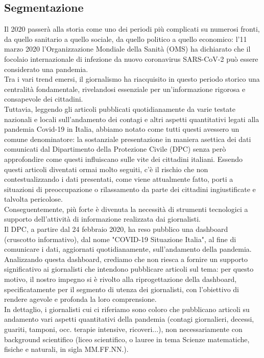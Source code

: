 \subsection{Segmentazione}
Il 2020 passerà alla storia come uno dei periodi più complicati su numerosi fronti, da quello sanitario a quello sociale, 
da quello politico a quello economico: l'11 marzo 2020 l'Organizzazione Mondiale della Sanità (OMS) ha dichiarato che il 
focolaio internazionale di infezione da nuovo coronavirus SARS-CoV-2 può essere considerato una pandemia.\\
Tra i vari trend emersi, il giornalismo ha riacquisito in questo periodo storico una centralità fondamentale, rivelandosi 
essenziale per un'informazione rigorosa e consapevole dei cittadini.\\
Tuttavia, leggendo gli articoli pubblicati quotidianamente da varie testate nazionali e locali sull'andamento dei contagi 
e altri aspetti quantitativi legati alla pandemia Covid-19 in Italia, abbiamo notato come tutti questi avessero un comune 
denominatore: la sostanziale presentazione in maniera asettica dei dati comunicati dal Dipartimento della Protezione Civile 
(DPC) senza però approfondire come questi influiscano sulle vite dei cittadini italiani. Essendo questi articoli diventati 
ormai molto seguiti, c'è il rischio che non contestualizzando i dati presentati, come viene attualmente fatto, porti a 
situazioni di preoccupazione o rilassamento da parte dei cittadini ingiustificate e talvolta pericolose.\\
Conseguentemente, più forte è divenuta la necessità di strumenti tecnologici a supporto dell'attività di informazione 
realizzata dai giornalisti.\\
Il DPC, a partire dal 24 febbraio 2020, ha reso pubblico una dashboard (cruscotto informativo), dal nome "COVID-19 Situazione Italia", 
al fine di comunicare i dati, aggiornati quotidianamente, sull'andamento della pandemia.\\
Analizzando questa dashboard, crediamo che non riesca a fornire un supporto significativo ai giornalisti che intendono pubblicare 
articoli sul tema: per questo motivo, il nostro impegno si è rivolto alla riprogettazione della dashboard, specificatamente per il 
segmento di utenza dei giornalisti, con l'obiettivo di rendere agevole e profonda la loro comprensione.\\
In dettaglio, i giornalisti cui ci riferiamo sono coloro che pubblicano articoli su andamento vari aspetti quantitativi della 
pandemia (contagi giornalieri, decessi, guariti, tamponi, occ. terapie intensive, ricoveri...), non necessariamente con 
background scientifico (liceo scientifico, o lauree in tema Scienze matematiche, fisiche e naturali, in sigla MM.FF.NN.).